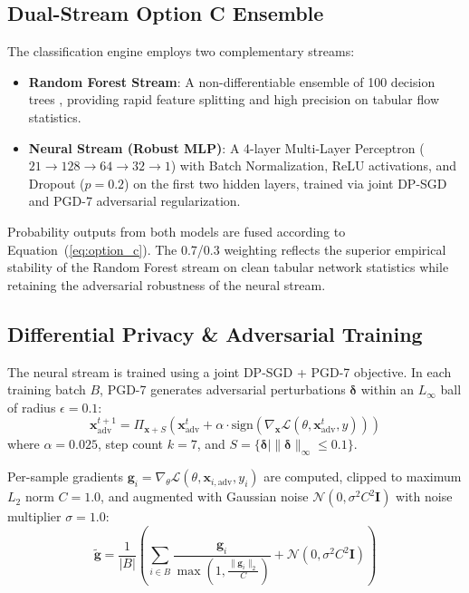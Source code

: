 \documentclass[10pt,journal,compsoc,twocolumn]{IEEEtran}
\begin{document}
\subsection{Dual-Stream Option C Ensemble}
The classification engine employs two complementary streams:
\begin{itemize}
    \item \textbf{Random Forest Stream}: A non-differentiable ensemble of 100 decision trees \cite{breiman2001random}, providing rapid feature splitting and high precision on tabular flow statistics.
    \item \textbf{Neural Stream (Robust MLP)}: A 4-layer Multi-Layer Perceptron ($21 \to 128 \to 64 \to 32 \to 1$) with Batch Normalization, ReLU activations, and Dropout ($p=0.2$) on the first two hidden layers, trained via joint DP-SGD and PGD-7 adversarial regularization.
\end{itemize}

Probability outputs from both models are fused according to Equation~(\ref{eq:option_c}). The 0.7/0.3 weighting reflects the superior empirical stability of the Random Forest stream on clean tabular network statistics while retaining the adversarial robustness of the neural stream.

\subsection{Differential Privacy \& Adversarial Training}
The neural stream is trained using a joint DP-SGD + PGD-7 objective. In each training batch $B$, PGD-7 generates adversarial perturbations $\mathbf{\delta}$ within an $L_\infty$ ball of radius $\epsilon = 0.1$:
\begin{equation}
\mathbf{x}_{\text{adv}}^{t+1} = \Pi_{\mathbf{x} + S}\left( \mathbf{x}_{\text{adv}}^t + \alpha \cdot \text{sign}(\nabla_{\mathbf{x}} \mathcal{L}(\theta, \mathbf{x}_{\text{adv}}^t, y)) \right)
\end{equation}
where $\alpha = 0.025$, step count $k=7$, and $S = \{ \mathbf{\delta} \mid \|\mathbf{\delta}\|_\infty \le 0.1 \}$.

Per-sample gradients $\mathbf{g}_i = \nabla_\theta \mathcal{L}(\theta, \mathbf{x}_{i, \text{adv}}, y_i)$ are computed, clipped to maximum $L_2$ norm $C = 1.0$, and augmented with Gaussian noise $\mathcal{N}(0, \sigma^2 C^2 \mathbf{I})$ with noise multiplier $\sigma = 1.0$:
\begin{equation}
\tilde{\mathbf{g}} = \frac{1}{|B|} \left( \sum_{i \in B} \frac{\mathbf{g}_i}{\max\left(1, \frac{\|\mathbf{g}_i\|_2}{C}\right)} + \mathcal{N}(0, \sigma^2 C^2 \mathbf{I}) \right)
\end{equation}
\end{document}
